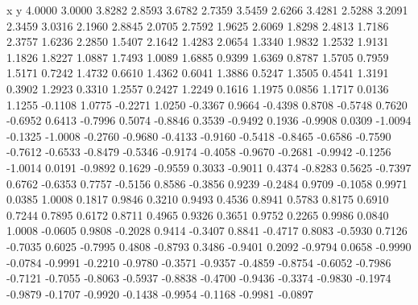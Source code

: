     x y    
    4.0000    3.0000
    3.8282    2.8593
    3.6782    2.7359
    3.5459    2.6266
    3.4281    2.5288
    3.2091    2.3459
    3.0316    2.1960
    2.8845    2.0705
    2.7592    1.9625
    2.6069    1.8298
    2.4813    1.7186
    2.3757    1.6236
    2.2850    1.5407
    2.1642    1.4283
    2.0654    1.3340
    1.9832    1.2532
    1.9131    1.1826
    1.8227    1.0887
    1.7493    1.0089
    1.6885    0.9399
    1.6369    0.8787
    1.5705    0.7959
    1.5171    0.7242
    1.4732    0.6610
    1.4362    0.6041
    1.3886    0.5247
    1.3505    0.4541
    1.3191    0.3902
    1.2923    0.3310
    1.2557    0.2427
    1.2249    0.1616
    1.1975    0.0856
    1.1717    0.0136
    1.1255   -0.1108
    1.0775   -0.2271
    1.0250   -0.3367
    0.9664   -0.4398
    0.8708   -0.5748
    0.7620   -0.6952
    0.6413   -0.7996
    0.5074   -0.8846
    0.3539   -0.9492
    0.1936   -0.9908
    0.0309   -1.0094
   -0.1325   -1.0008
   -0.2760   -0.9680
   -0.4133   -0.9160
   -0.5418   -0.8465
   -0.6586   -0.7590
   -0.7612   -0.6533
   -0.8479   -0.5346
   -0.9174   -0.4058
   -0.9670   -0.2681
   -0.9942   -0.1256
   -1.0014    0.0191
   -0.9892    0.1629
   -0.9559    0.3033
   -0.9011    0.4374
   -0.8283    0.5625
   -0.7397    0.6762
   -0.6353    0.7757
   -0.5156    0.8586
   -0.3856    0.9239
   -0.2484    0.9709
   -0.1058    0.9971
    0.0385    1.0008
    0.1817    0.9846
    0.3210    0.9493
    0.4536    0.8941
    0.5783    0.8175
    0.6910    0.7244
    0.7895    0.6172
    0.8711    0.4965
    0.9326    0.3651
    0.9752    0.2265
    0.9986    0.0840
    1.0008   -0.0605
    0.9808   -0.2028
    0.9414   -0.3407
    0.8841   -0.4717
    0.8083   -0.5930
    0.7126   -0.7035
    0.6025   -0.7995
    0.4808   -0.8793
    0.3486   -0.9401
    0.2092   -0.9794
    0.0658   -0.9990
   -0.0784   -0.9991
   -0.2210   -0.9780
   -0.3571   -0.9357
   -0.4859   -0.8754
   -0.6052   -0.7986
   -0.7121   -0.7055
   -0.8063   -0.5937
   -0.8838   -0.4700
   -0.9436   -0.3374
   -0.9830   -0.1974
   -0.9879   -0.1707
   -0.9920   -0.1438
   -0.9954   -0.1168
   -0.9981   -0.0897